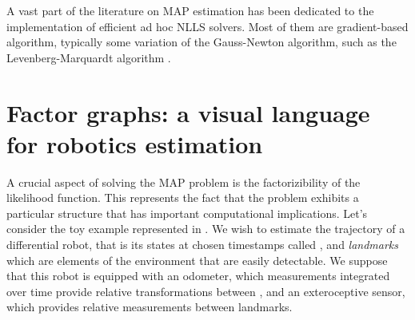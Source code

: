 A vast part of the literature on MAP estimation has been dedicated to the implementation of efficient ad hoc NLLS solvers. Most of them are 
gradient-based algorithm, typically some variation of the Gauss-Newton algorithm, such as the Levenberg-Marquardt algorithm \cite{boyd2004convex}.


\section{Factor graphs: a visual language for robotics estimation}
A crucial aspect of solving the MAP problem is the factorizibility of the likelihood function. This represents the fact that the problem
exhibits a particular structure that has important computational implications. Let's consider the toy example represented in . 
We wish to estimate the trajectory of a differential robot, that is its states at chosen timestamps called \textit{\keyframes}, and \textit{landmarks} which are elements of the 
environment that are easily detectable. We suppose that this robot is equipped with an odometer, which measurements integrated over time provide relative 
transformations between \keyframes, and an exteroceptive sensor, which provides relative measurements between \keyframes landmarks.

